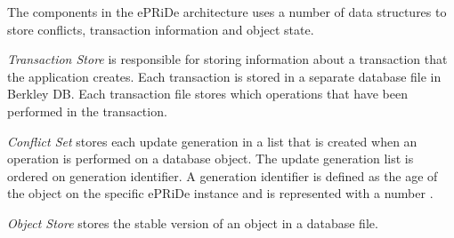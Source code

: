 The components in the ePRiDe architecture uses a number of data structures to store conflicts, transaction information and object state. 

\emph{Transaction Store} is responsible for storing information about a transaction that the application creates. Each transaction is stored in a separate database file in Berkley DB.  Each transaction file stores which operations that have been performed in the transaction.

\emph{Conflict Set} stores each update generation in a list that is created when an operation is performed on a database object. The update generation list is ordered on generation identifier. A generation identifier is defined as the age of the object on the specific ePRiDe instance and is represented with a number \cite[]{Syber2007}.    
 
\emph{Object Store} stores the stable version of an object in a database file.




%




%	
